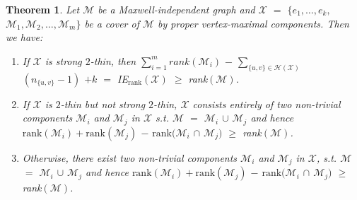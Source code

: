 \documentclass[10pt]{article}
\def\M{\mathcal {M}}
\def\H{\mathcal {H}}
\def\X{\mathcal {X}}
\newtheorem{thm}{Theorem}
\begin{document}
\begin{thm}\label{thm:propermaximal}
Let $\M$ be a Maxwell-independent graph and $\X$ $=$ $\{e_1, \ldots, e_k,$ $\M_1, \M_2, \ldots, \M_m\}$ be a cover of $\M$ by proper vertex-maximal components. Then we have:
\begin{enumerate}
\item If $\X$ is strong $2$-thin, then $\sum_{i=1}^m rank(\M_i)$ $-$ $\sum_{{\{u, v\}} \in \H(\X)}$ $(n_{\{u, v\}} -1)$ $+k$ $=$ IE$_\text{rank}(\X)$ $\ge$ rank$(\M)$.
\item If $\X$ is $2$-thin but not strong $2$-thin, $\X$ consists entirely of two non-trivial components $\M_i$ and $\M_j$ in $\X$ s.t. $\M$ $=$ $\M_i$ $\cup$ $\M_j$ and hence $\text{rank}(\M_i) +\text{rank}(\M_j)$ $-$ $\text{rank}(\M_i$ $\cap$ $\M_j)$ $\geq$ rank$(\M)$.
\item Otherwise, there exist two non-trivial components $\M_i$ and $\M_j$ in $\X$, s.t. $\M$ $=$ $\M_i$ $\cup$ $\M_j$ and hence $\text{rank}(\M_i) +\text{rank}(\M_j)$ $-$ $\text{rank}(\M_i$ $\cap$ $\M_j)$ $\geq$ rank$(\M)$.
\end{enumerate}

\end{thm}
\end{document}
